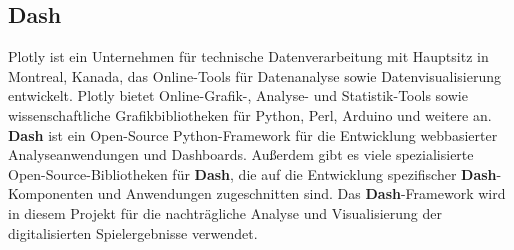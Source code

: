 \subsection{Dash}
Plotly ist ein Unternehmen für technische Datenverarbeitung mit Hauptsitz in Montreal, Kanada, das Online-Tools für Datenanalyse sowie Datenvisualisierung entwickelt. 
Plotly bietet Online-Grafik-, Analyse- und Statistik-Tools sowie wissenschaftliche Grafikbibliotheken für Python, Perl, Arduino und weitere an.
\textbf{Dash} ist ein Open-Source Python-Framework für die Entwicklung webbasierter Analyseanwendungen und Dashboards. 
Außerdem gibt es viele spezialisierte Open-Source-Bibliotheken für \textbf{Dash}, die auf die Entwicklung spezifischer \textbf{Dash}-Komponenten und  Anwendungen zugeschnitten sind. Das \textbf{Dash}-Framework wird in diesem Projekt für die nachträgliche Analyse und Visualisierung der digitalisierten Spielergebnisse verwendet.
